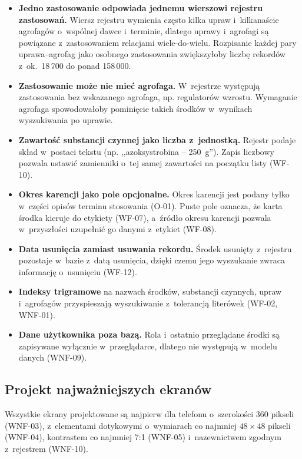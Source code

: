 \begin{itemize}
    \item \textbf{Jedno zastosowanie odpowiada jednemu wierszowi rejestru
    zastosowań.} Wiersz rejestru wymienia często kilka upraw i~kilkanaście
    agrofagów o~wspólnej dawce i~terminie, dlatego uprawy i~agrofagi są
    powiązane z~zastosowaniem relacjami wiele-do-wielu. Rozpisanie każdej pary
    uprawa--agrofag jako osobnego zastosowania zwiększyłoby liczbę rekordów
    z~ok.~18\,700 do ponad 158\,000.
    \item \textbf{Zastosowanie może nie mieć agrofaga.} W~rejestrze występują
    zastosowania bez wskazanego agrofaga, np. regulatorów wzrostu. Wymaganie
    agrofaga spowodowałoby pominięcie takich środków w~wynikach wyszukiwania po
    uprawie.
    \item \textbf{Zawartość substancji czynnej jako liczba z~jednostką.}
    Rejestr podaje skład w~postaci tekstu (np. ,,azoksystrobina -- 250~g'').
    Zapis liczbowy pozwala ustawić zamienniki o~tej samej zawartości na
    początku listy (WF-10).
    \item \textbf{Okres karencji jako pole opcjonalne.} Okres karencji jest
    podany tylko w~części opisów terminu stosowania (O-01). Puste pole oznacza,
    że karta środka kieruje do etykiety (WF-07), a~źródło okresu karencji
    pozwala w~przyszłości uzupełnić go danymi z~etykiet (WF-08).
    \item \textbf{Data usunięcia zamiast usuwania rekordu.} Środek usunięty
    z~rejestru pozostaje w~bazie z~datą usunięcia, dzięki czemu jego wyszukanie
    zwraca informację o~usunięciu (WF-12).
    \item \textbf{Indeksy trigramowe} na nazwach środków, substancji czynnych,
    upraw i~agrofagów przyspieszają wyszukiwanie z~tolerancją literówek
    (WF-02, WNF-01).
    \item \textbf{Dane użytkownika poza bazą.} Rola i~ostatnio przeglądane
    środki są zapisywane wyłącznie w~przeglądarce, dlatego nie występują
    w~modelu danych (WNF-09).
\end{itemize}

\subsection{Projekt najważniejszych ekranów}

Wszystkie ekrany projektowane są najpierw dla telefonu o~szerokości 360
pikseli (WNF-03), z~elementami dotykowymi o~wymiarach co najmniej
$48 \times 48$ pikseli (WNF-04), kontrastem co najmniej 7:1 (WNF-05)
i~nazewnictwem zgodnym z~rejestrem (WNF-10).

